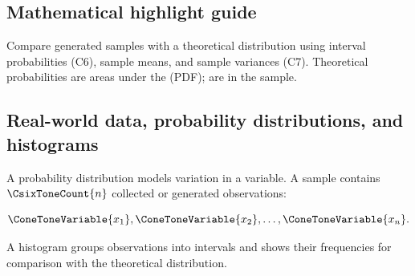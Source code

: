 \subsection*{Mathematical highlight guide}
\label{tone:C6C7:legend}


\vspace{8mm}

Compare generated samples with a theoretical distribution using interval
probabilities (C6), sample means, and sample variances (C7).
Theoretical probabilities are areas under the   
(PDF);   are   in the sample.


\subsection{Real-world data, probability distributions, and histograms}
\label{sec:c6-intro-samples-histograms}

A probability distribution models variation in a variable. A sample contains
$\CsixToneCount{n}$ collected or generated observations:

$$
\ConeToneVariable{x_1},\ConeToneVariable{x_2},\ldots,\ConeToneVariable{x_n}.
$$

A histogram groups observations into intervals and shows their frequencies
for comparison with the theoretical distribution.

